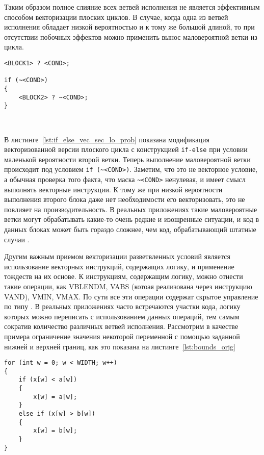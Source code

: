 \documentclass[
11pt,%
tightenlines,%
twoside,%
onecolumn,%
nofloats,%
nobibnotes,%
nofootinbib,%
superscriptaddress,%
noshowpacs,%
centertags]%
{revtex4}
\begin{document}
Таким образом полное слияние всех ветвей исполнения не является эффективным способом векторизации плоских циклов.
В случае, когда одна из ветвей исполнения обладает низкой вероятностью и к тому же большой длиной, то при отсутствии побочных эффектов можно применить вынос маловероятной ветки из цикла.

\begin{lstlisting}[caption={Векторизованная конструкция \texttt{if-else} с маловероятной второй веткой.},label={lst:if_else_vec_sec_lo_prob}]
<BLOCK1> ? <COND>;

if (~<COND>)
{
    <BLOCK2> ? ~<COND>;
}
\end{lstlisting}

\

В листинге~\ref{lst:if_else_vec_sec_lo_prob} показана модификация векторизованной версии плоского цикла с конструкцией \texttt{if-else} при условии маленькой вероятности второй ветки.
Теперь выполнение маловероятной ветки происходит под условием \texttt{if (\~{}<COND>)}.
Заметим, что это не векторное условие, а обычная проверка того факта, что маска \texttt{\~{}<COND>} ненулевая, и имеет смысл выполнять векторные инструкции.
К тому же при низкой вероятности выполнения второго блока даже нет необходимости его векторизовать, это не повлияет на производительность.
В реальных приложениях такие маловероятные ветки могут обрабатывать какие-то очень редкие и изощренные ситуации, и код в данных блоках может быть гораздо сложнее, чем код, обрабатывающий штатные случаи \cite{Rybakov_Aircraft}.

Другим важным приемом векторизации разветвленных условий является использование векторных инструкций, содержащих логику, и применение тождеств на их основе.
К инструкциям, содержащим логику, можно отнести такие операции, как VBLENDM, VABS (котоая реализована через инструкцию VAND), VMIN, VMAX.
По сути все эти операции содержат скрытое управление по типу .
В реальных приложениях часто встречаются участки кода, логику которых можно переписать с использованием данных операций, тем самым сократив количество различных ветвей исполнения.
Рассмотрим в качестве примера ограничение значения некоторой переменной с помощью заданной нижней и верхней границ, как это показана на листинге~\ref{lst:bounds_orig}

\begin{lstlisting}[caption={Ограничение значения величины с помощью нижней и верхней границ.},label={lst:bounds_orig}]
for (int w = 0; w < WIDTH; w++)
{
    if (x[w] < a[w])
    {
        x[w] = a[w];
    }
    else if (x[w] > b[w])
    {
        x[w] = b[w];
    }
}
\end{lstlisting}
\end{document}
